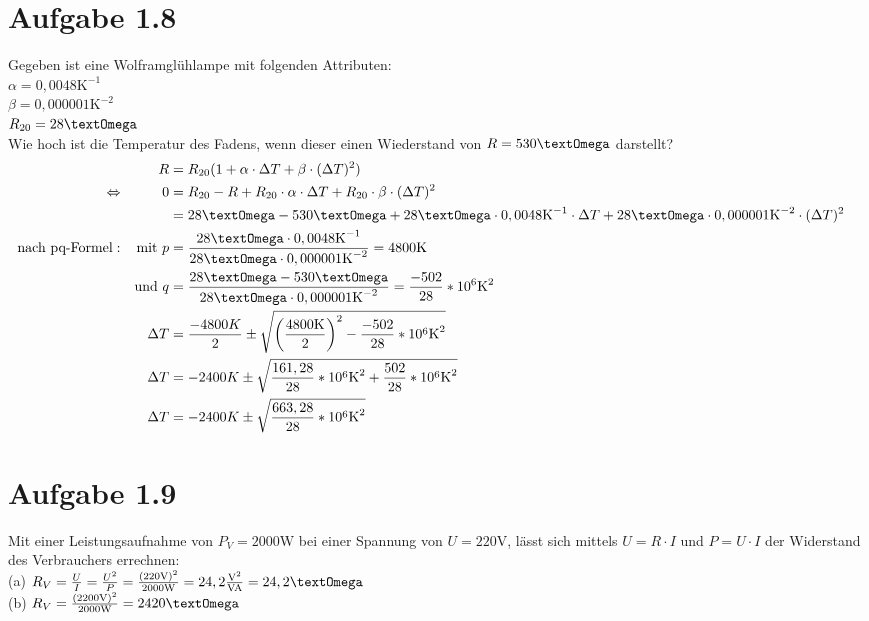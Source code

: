 \documentclass[]{article}
\newcommand{\eq}{\Leftrightarrow}
\newcommand{\unit}[1]{\text{#1}}
\newcommand{\fracunit}[2]{\frac{\unit{#1}}{\unit{#2}}}
\newcommand{\textsq}[1]{\ensuremath{\text{#1}^2}}
\begin{document}
\section*{Aufgabe 1.8}
\par
\begin{samepage}
	Gegeben ist eine Wolframglühlampe mit folgenden Attributen:\\
	$\alpha = 0,0048\unit{K}^{-1}$\\
	$\beta = 0,000001\unit{K}^{-2}$\\
	$R_{20} = 28 \unit{\textOmega}$\\
	Wie hoch ist die Temperatur des Fadens, wenn dieser einen Wiederstand von $R = 530\unit{\textOmega}$ darstellt?\\
	\begin{align*}
		&& R &= R_{20}(1+ \alpha \cdot \Delta T + \beta \cdot (\Delta T)^2) &&\\
		\eq&& 0 &= R_{20} - R + R_{20} \cdot \alpha \cdot \Delta T + R_{20} \cdot \beta \cdot (\Delta T)^2 &&\\
		&& &= 28 \unit{\textOmega} - 530\unit{\textOmega} + 28 \unit{\textOmega} \cdot 0,0048\unit{K}^{-1} \cdot \Delta T + 28 \unit{\textOmega} \cdot 0,000001\unit{K}^{-2} \cdot (\Delta T)^2 &&\\
		\text{nach pq-Formel}:&& \text{mit~} p &= \frac{28 \unit{\textOmega} \cdot 0,0048\unit{K}^{-1}}{28 \unit{\textOmega} \cdot 0,000001\unit{K}^{-2}} = 4800\unit{K} &&\\
		&& \text{und~} q &= \frac{28 \unit{\textOmega} - 530\unit{\textOmega}}{28 \unit{\textOmega} \cdot 0,000001\unit{K}^{-2}} = \frac{-502}{28}* 10^6 \unit{\textsq{K}} &&\\
		&&\Delta T &= \frac{-4800K}{2} \pm \sqrt{\left(\frac{4800\unit{K}}{2}\right)^2 - \frac{-502}{28}*10^6 \unit{\textsq{K}}} &&\\
		&&\Delta T &= -2400K \pm \sqrt{\frac{161,28}{28}*10^6\unit{\textsq{K}} + \frac{502}{28}* 10^6 \unit{\textsq{K}}} &&\\
		&&\Delta T &= -2400K \pm \sqrt{\frac{663,28}{28}*10^6\unit{\textsq{K}}} &&\\
	\end{align*}
\end{samepage}
\section*{Aufgabe 1.9}
\par
	Mit einer Leistungsaufnahme von $P_V = 2000\unit{W}$ bei einer Spannung von $U = 220\unit{V}$, lässt sich mittels $U = R \cdot I$ und $P = U \cdot I$ der Widerstand des Verbrauchers errechnen:\\
	(a) $R_V = \frac{U}{I} = \frac{U^2}{P} = \frac{(220\unit{V})^2}{2000\unit{W}} = 24,2 \fracunit{\textsq{V}}{VA} = 24,2 \unit{\textOmega}$\\
	(b) $R_V = \frac{(2200\unit{V})^2}{2000\unit{W}} = 2420 \unit{\textOmega}$
\end{document}
